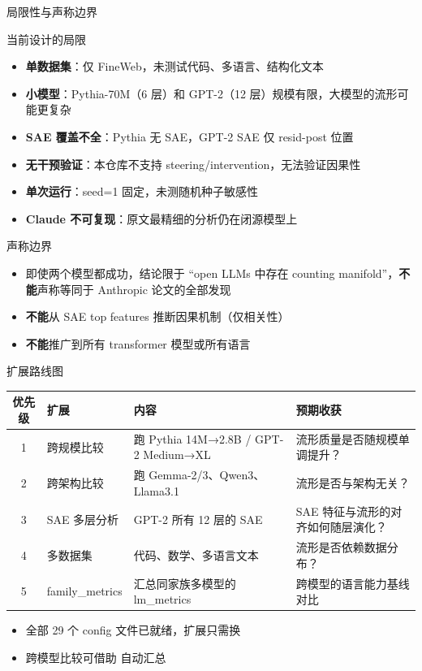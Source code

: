 \begin{frame}{局限性与声称边界}
\small
\begin{block}{当前设计的局限}
\begin{itemize}
  \item \textbf{单数据集}：仅 FineWeb，未测试代码、多语言、结构化文本
  \item \textbf{小模型}：Pythia-70M（6 层）和 GPT-2（12 层）规模有限，大模型的流形可能更复杂
  \item \textbf{SAE 覆盖不全}：Pythia 无 SAE，GPT-2 SAE 仅 resid-post 位置
  \item \textbf{无干预验证}：本仓库不支持 steering/intervention，无法验证因果性
  \item \textbf{单次运行}：seed=1 固定，未测随机种子敏感性
  \item \textbf{Claude 不可复现}：原文最精细的分析仍在闭源模型上
\end{itemize}
\end{block}

\begin{alertblock}{声称边界}
\begin{itemize}
  \item 即使两个模型都成功，结论限于 ``open LLMs 中存在 counting manifold''，\textbf{不能}声称等同于 Anthropic 论文的全部发现
  \item \textbf{不能}从 SAE top features 推断因果机制（仅相关性）
  \item \textbf{不能}推广到所有 transformer 模型或所有语言
\end{itemize}
\end{alertblock}
\end{frame}

\begin{frame}{扩展路线图}
\small
\begin{tabularx}{\linewidth}{cl>{\raggedright\arraybackslash}p{6cm}X}
\toprule
优先级 & 扩展 & 内容 & 预期收获 \\
\midrule
1 & 跨规模比较 & 跑 Pythia 14M→2.8B / GPT-2 Medium→XL & 流形质量是否随规模单调提升？ \\
2 & 跨架构比较 & 跑 Gemma-2/3、Qwen3、Llama3.1 & 流形是否与架构无关？ \\
3 & SAE 多层分析 & GPT-2 所有 12 层的 SAE & SAE 特征与流形的对齐如何随层演化？ \\
4 & 多数据集 & 代码、数学、多语言文本 & 流形是否依赖数据分布？ \\
5 & family\_metrics & 汇总同家族多模型的 lm\_metrics & 跨模型的语言能力基线对比 \\
\bottomrule
\end{tabularx}

\vspace{0.4em}
\begin{itemize}
  \item 全部 29 个 config 文件已就绪，扩展只需换 
  \item 跨模型比较可借助  自动汇总
\end{itemize}
\end{frame}

